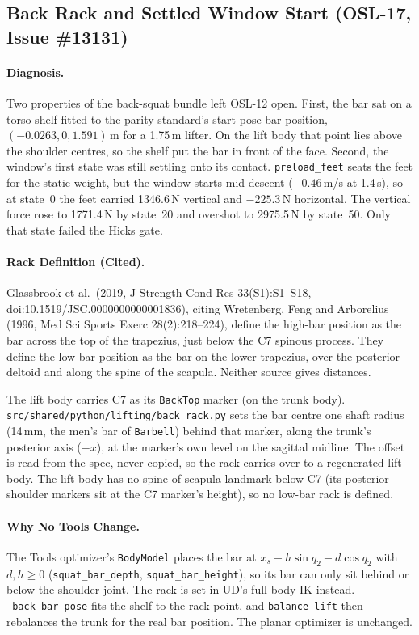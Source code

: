 \documentclass[11pt,a4paper]{article}
\begin{document}
\subsection{Back Rack and Settled Window Start (OSL-17, Issue \#13131)}
\paragraph{Diagnosis.} Two properties of the back-squat bundle left OSL-12
open. First, the bar sat on a torso shelf fitted to the parity standard's
start-pose bar position, $(-0.0263, 0, 1.591)$\,m for a 1.75\,m lifter. On
the lift body that point lies above the shoulder centres, so the shelf put
the bar in front of the face. Second, the window's first state was still
settling onto its contact. \texttt{preload\_feet} seats the feet for the
static weight, but the window starts mid-descent ($-0.46$\,m/s at 1.4\,s), so
at state~0 the feet carried 1346.6\,N vertical and $-225.3$\,N horizontal.
The vertical force rose to 1771.4\,N by state~20 and overshot to 2975.5\,N by
state~50. Only that state failed the Hicks gate.

\paragraph{Rack Definition (Cited).} Glassbrook et al.\ (2019, J Strength
Cond Res 33(S1):S1--S18, doi:10.1519/JSC.0000000000001836), citing
Wretenberg, Feng and Arborelius (1996, Med Sci Sports Exerc 28(2):218--224),
define the high-bar position as the bar across the top of the trapezius,
just below the C7 spinous process. They define the low-bar position as the
bar on the lower trapezius, over the posterior deltoid and along the spine
of the scapula. Neither source gives distances.

The lift body carries C7 as its \texttt{BackTop} marker (on the trunk body).
\texttt{src/shared/python/lifting/back\_rack.py} sets the bar centre one
shaft radius (14\,mm, the men's bar of \texttt{Barbell}) behind that marker,
along the trunk's posterior axis ($-x$), at the marker's own level on the
sagittal midline. The offset is read from the spec, never copied, so the rack
carries over to a regenerated lift body. The lift body has no
spine-of-scapula landmark below C7 (its posterior shoulder markers sit at the
C7 marker's height), so no low-bar rack is defined.

\paragraph{Why No Tools Change.} The Tools optimizer's \texttt{BodyModel}
places the bar at $x_s - h\sin q_2 - d\cos q_2$ with
$d, h \ge 0$ (\texttt{squat\_bar\_depth}, \texttt{squat\_bar\_height}), so
its bar can only sit behind or below the shoulder joint. The rack is set in
UD's full-body IK instead. \texttt{\_back\_bar\_pose} fits the shelf to the
rack point, and \texttt{balance\_lift} then rebalances the trunk for the real
bar position. The planar optimizer is unchanged.
\end{document}
